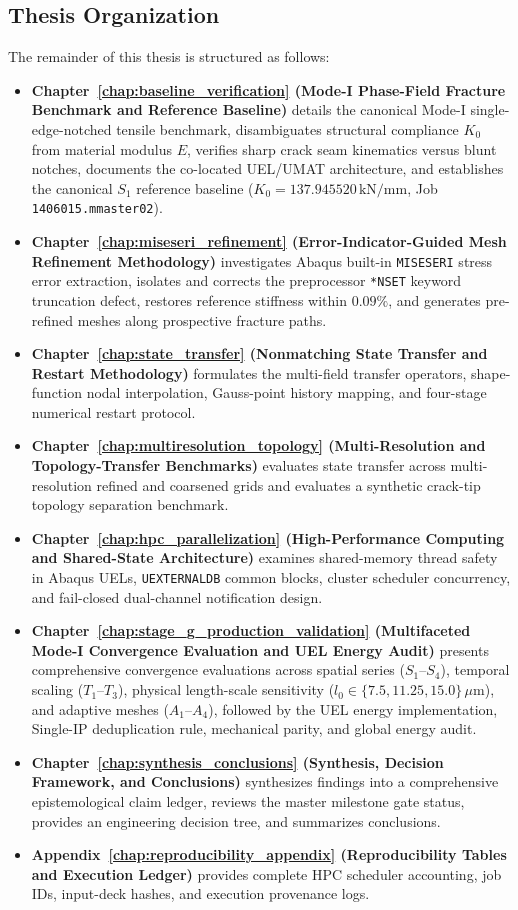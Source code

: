 \subsection{Thesis Organization}
The remainder of this thesis is structured as follows:
\begin{itemize}
    \item \textbf{Chapter~\ref{chap:baseline_verification} (Mode-I Phase-Field Fracture Benchmark and Reference Baseline)} details the canonical Mode-I single-edge-notched tensile benchmark, disambiguates structural compliance $K_0$ from material modulus $E$, verifies sharp crack seam kinematics versus blunt notches, documents the co-located UEL/UMAT architecture, and establishes the canonical $S_1$ reference baseline ($K_0 = 137.945520\,\text{kN/mm}$, Job \texttt{1406015.mmaster02}).
    \item \textbf{Chapter~\ref{chap:miseseri_refinement} (Error-Indicator-Guided Mesh Refinement Methodology)} investigates Abaqus built-in \texttt{MISESERI} stress error extraction, isolates and corrects the preprocessor \texttt{*NSET} keyword truncation defect, restores reference stiffness within $0.09\%$, and generates pre-refined meshes along prospective fracture paths.
    \item \textbf{Chapter~\ref{chap:state_transfer} (Nonmatching State Transfer and Restart Methodology)} formulates the multi-field transfer operators, shape-function nodal interpolation, Gauss-point history mapping, and four-stage numerical restart protocol.
    \item \textbf{Chapter~\ref{chap:multiresolution_topology} (Multi-Resolution and Topology-Transfer Benchmarks)} evaluates state transfer across multi-resolution refined and coarsened grids and evaluates a synthetic crack-tip topology separation benchmark.
    \item \textbf{Chapter~\ref{chap:hpc_parallelization} (High-Performance Computing and Shared-State Architecture)} examines shared-memory thread safety in Abaqus UELs, \texttt{UEXTERNALDB} common blocks, cluster scheduler concurrency, and fail-closed dual-channel notification design.
    \item \textbf{Chapter~\ref{chap:stage_g_production_validation} (Multifaceted Mode-I Convergence Evaluation and UEL Energy Audit)} presents comprehensive convergence evaluations across spatial series ($S_1$--$S_4$), temporal scaling ($T_1$--$T_3$), physical length-scale sensitivity ($l_0 \in \{7.5, 11.25, 15.0\}\,\mu\text{m}$), and adaptive meshes ($A_1$--$A_4$), followed by the UEL energy implementation, Single-IP deduplication rule, mechanical parity, and global energy audit.
    \item \textbf{Chapter~\ref{chap:synthesis_conclusions} (Synthesis, Decision Framework, and Conclusions)} synthesizes findings into a comprehensive epistemological claim ledger, reviews the master milestone gate status, provides an engineering decision tree, and summarizes conclusions.
    \item \textbf{Appendix~\ref{chap:reproducibility_appendix} (Reproducibility Tables and Execution Ledger)} provides complete HPC scheduler accounting, job IDs, input-deck hashes, and execution provenance logs.
\end{itemize}

